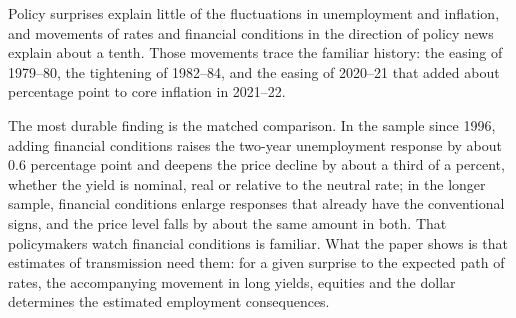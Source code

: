 \documentclass[11pt]{article}
\begin{document}
Policy surprises explain little of the fluctuations in unemployment and inflation, and movements of rates and financial conditions in the direction of policy news explain about a tenth. Those movements trace the familiar history: the easing of 1979--80, the tightening of 1982--84, and the easing of 2020--21 that added about  percentage point to core inflation in 2021--22.

The most durable finding is the matched comparison. In the sample since 1996, adding financial conditions raises the two-year unemployment response by about 0.6 percentage point and deepens the price decline by about a third of a percent, whether the yield is nominal, real or relative to the neutral rate; in the longer sample, financial conditions enlarge responses that already have the conventional signs, and the price level falls by about the same amount in both. That policymakers watch financial conditions is familiar. What the paper shows is that estimates of transmission need them: for a given surprise to the expected path of rates, the accompanying movement in long yields, equities and the dollar determines the estimated employment consequences.

\FloatBarrier


\end{document}
